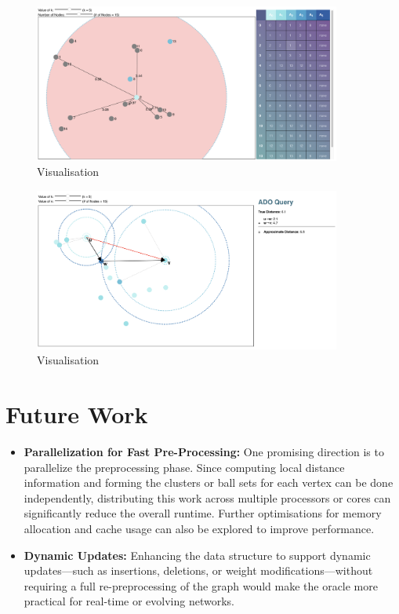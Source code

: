 \documentclass{article}
\begin{document}
\begin{figure}
\begin{center}
    \includegraphics[width=0.9\textwidth]{img/v1.png}
    \caption{Visualisation}
    \label{fig:visualisation1}
\end{center}
\end{figure}

\begin{figure}
\begin{center}
    \includegraphics[width=0.9\textwidth]{img/v2.png}
    \caption{Visualisation}
    \label{fig:visualisation2}
\end{center}
\end{figure}

\section{Future Work}

\begin{itemize}
    \item \textbf{Parallelization for Fast Pre-Processing:} One promising direction is to parallelize the preprocessing phase. Since computing local distance information and forming the clusters or ball sets for each vertex can be done independently, distributing this work across multiple processors or cores can significantly reduce the overall runtime. Further optimisations for memory allocation and cache usage can also be explored to improve performance.
    
    \item \textbf{Dynamic Updates:} Enhancing the data structure to support dynamic updates—such as insertions, deletions, or weight modifications—without requiring a full re-preprocessing of the graph would make the oracle more practical for real-time or evolving networks.
\end{itemize}
\end{document}

